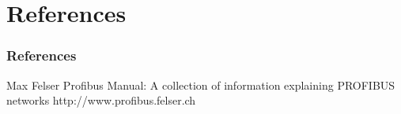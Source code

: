 \documentclass{beamer}
\begin{document}
%
%
\section*{References}
\begin{frame}[allowframebreaks]
  \frametitle{References}
  \begin{thebibliography}{10}
  \beamertemplatebookbibitems
    Max Felser
    \newblock Profibus Manual: A collection of information explaining PROFIBUS networks
    \newblock http://www.profibus.felser.ch
   \end{thebibliography}
 \end{frame}
\end{document}

